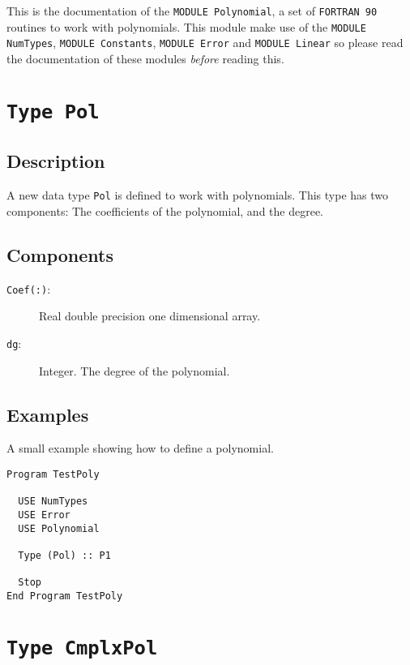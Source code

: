 This is the documentation of the \texttt{MODULE Polynomial}, a set
of \texttt{FORTRAN 90} routines to work with polynomials. This
module make use of the \texttt{MODULE NumTypes}, \texttt{MODULE
  Constants}, \texttt{MODULE Error} and \texttt{MODULE Linear} so
please read the documentation of these modules \emph{before} reading
this. 

\section{\texttt{Type Pol}}

\subsection{Description}

A new data type \texttt{Pol} is defined to work with polynomials. This
type has two components: The coefficients of the polynomial, and the
degree. 

\subsection{Components}

\begin{description}
\item[\texttt{Coef(:)}: ] Real double precision one dimensional
  array.
\item[\texttt{dg}:] Integer. The degree of the polynomial.
\end{description}

\subsection{Examples}

A small example showing how to define a polynomial.

\begin{lstlisting}[emph=Type,
                   emphstyle=\color{blue},
                   frame=trBL,
                   caption=Defining a polynomial.,
                   label=typepol]
Program TestPoly

  USE NumTypes
  USE Error
  USE Polynomial

  Type (Pol) :: P1

  Stop
End Program TestPoly
\end{lstlisting}

\section{\texttt{Type CmplxPol}}

